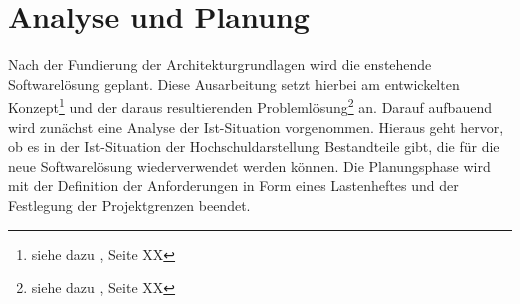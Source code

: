 \section{Analyse und Planung}
\label{sec:AnalyseUndPlanung}
Nach der Fundierung der Architekturgrundlagen wird die enstehende Softwarelösung geplant. Diese Ausarbeitung setzt hierbei
am entwickelten Konzept\footnote{siehe dazu \citet{unternehmensfuehrung2014}, Seite XX} und der daraus resultierenden Problemlösung\footnote{siehe dazu \citet{unternehmensfuehrung2014}, Seite XX} an.
Darauf aufbauend wird zunächst eine Analyse der Ist-Situation vorgenommen. 
Hieraus geht hervor, ob es in der Ist-Situation der Hochschuldarstellung Bestandteile gibt, die für die 
neue Softwarelösung wiederverwendet werden können. Die Planungsphase wird mit der Definition der Anforderungen in 
Form eines Lastenheftes und der Festlegung der Projektgrenzen beendet.